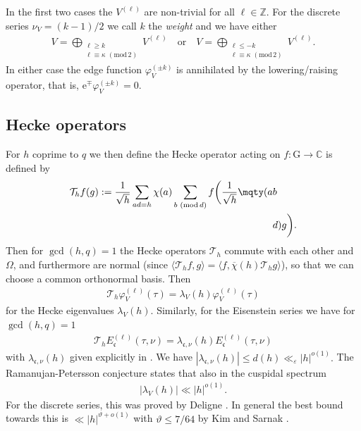 \documentclass[12pt]{amsart}
\theoremstyle{definition}
\theoremstyle{remark}
\numberwithin{equation}{section}
\newcommand{\G}{\mathrm{G}}
\newcommand{\C}{{\mathbb C}}
\newcommand{\Z}{{\mathbb Z}}
\newcommand{\1}{{\mathbf 1}}
\newcommand{\eps}{\varepsilon}
\renewcommand{\pmod}[1]{\,\,(\mathrm{mod}\,{#1})}
\begin{document}
 In the first two cases the $V^{(\ell)}$ are non-trivial for all $\ell \in \Z$. For the discrete series $\nu_V = (k-1)/2$ we call $k$ the \emph{weight} and we have either
\begin{align*}
    V = \bigoplus_{\substack{\ell  \geq k\\ \ell \equiv \kappa\pmod{2}}} V^{(\ell)} \quad \text{or} \quad   V= \bigoplus_{\substack{\ell  \leq - k\\  \ell \equiv \kappa\pmod{2}}} V^{(\ell)}.
\end{align*}
In either case the edge function $\varphi_V^{(\pm k)}$ is annihilated by the lowering/raising operator, that is, $\mathrm{e}^{\mp} \varphi_V^{(\pm k)} = 0$. 


\subsection{Hecke operators}

For $h$ coprime to $q$ we then define the Hecke operator acting on $f:\G \to \C$ is defined by
\begin{align} \label{eq:heckeopdef}
    \mathcal{T}_h f(g) :=  \frac{1}{\sqrt{h}} \sum_{ad=h} \chi(a) \sum_{b  \pmod{d}} f\bigg(\frac{1}{\sqrt{h}}\mqty(a & b  \\ & d)g\bigg).
\end{align} 
Then for $\gcd(h,q)=1$ the Hecke operators $\mathcal{T}_h$ commute with each other and $\Omega$,  and furthermore are normal (since $\langle \mathcal{T}_h f,g \rangle = \langle  f, \overline{\chi}(h)\mathcal{T}_h g \rangle $), so that we can choose a common orthonormal basis. Then 
\begin{align}\label{eq:heckecusp}
    \mathcal{T}_h \varphi_V^{(\ell)} (\tau) = \lambda_V(h) \varphi_V^{(\ell)} (\tau)
\end{align}
for the Hecke eigenvalues $\lambda_V(h)$. Similarly, for the Eisenstein series we have for $\gcd(h,q)=1$ \cite[(6.16)]{DFIartin}
\begin{align}\label{eq:heckeeis}
    \mathcal{T}_h E_{\mathfrak{c}}^{(\ell)} (\tau,\nu) = \lambda_{\mathfrak{c},\nu}(h) E_{\mathfrak{c}}^{(\ell)} (\tau,\nu)
\end{align}
with $\lambda_{\mathfrak{c},\nu}(h) $ given explicitly in \cite[(6.17)]{DFIartin}. 
We have  $|\lambda_{\mathfrak{c},\nu}(h)| \leq d(h)  \ll_\eps |h|^{o(1)}.$ The Ramanujan-Petersson conjecture states that also in the cuspidal spectrum
\begin{align*}
 |\lambda_{V}(h)| \ll |h|^{o(1)}.
\end{align*}
For the discrete series, this was proved by Deligne \cite{Deligne1968-1969}. In general the best bound towards this is $ \ll |h|^{\vartheta+o(1)}$ with $\vartheta\leq 7/64$ by Kim and Sarnak \cite{KimSarnak}. 
\end{document}
